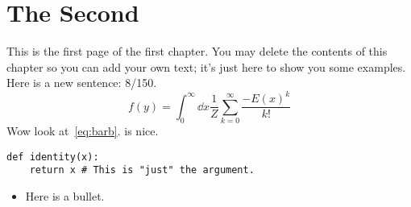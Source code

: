 \documentclass[../notebook.tex]{subfiles}
\begin{document}
\section{The Second}

This is the first page of the first chapter. You may delete the
contents of this chapter so you can add your own text; it's just here to show
you some examples. Here is a new sentence: 8/150.
\begin{equation}
  f(y)
  = \int_0^\infty \dd{x}\frac{1}{Z}\sum_{k=0}^\infty \frac{-{E(x)}^k}{k!}
  \label{eq:barb}
\end{equation}
Wow look at~\cref{eq:barb}.  is nice.
\begin{verbatim}
def identity(x):
    return x # This is "just" the argument.
\end{verbatim}
\begin{itemize}
  \item Here is a bullet.
\end{itemize}

\lipsum%
\end{document}
